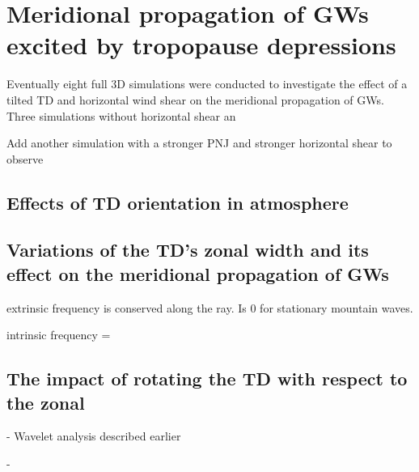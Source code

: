 \section{Meridional propagation of GWs excited by tropopause depressions}
\label{sec:results3D}

Eventually eight full 3D simulations were conducted to investigate the effect of a tilted TD and horizontal wind shear on the meridional propagation of GWs.
Three simulations without horizontal shear an


Add another simulation with a stronger PNJ and stronger horizontal shear to observe 
\subsection{Effects of TD orientation in atmosphere}


\subsection{Variations of the TD's zonal width and its effect on the meridional propagation of GWs}

extrinsic frequency is conserved along the ray. Is 0 for stationary mountain waves.

intrinsic frequency = 




\subsection{The impact of rotating the TD with respect to the zonal}

- Wavelet analysis described earlier

- 

